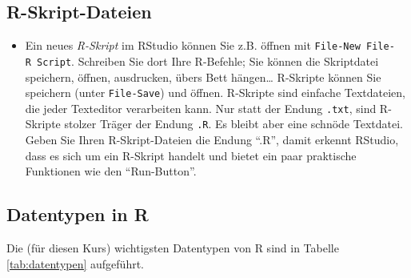 \documentclass[12pt,ngerman,]{book}
\providecommand{\tightlist}{%
  \setlength{\itemsep}{0pt}\setlength{\parskip}{0pt}}
\theoremstyle{definition}
\theoremstyle{definition}
\theoremstyle{remark}
\begin{document}
\subsection{R-Skript-Dateien}\label{r-skript-dateien}

\begin{itemize}
\tightlist
\item
  Ein neues \emph{R-Skript} im RStudio können Sie z.B.
  öffnen mit \texttt{File-New\ File-R\ Script}. Schreiben Sie dort Ihre
  R-Befehle; Sie können die Skriptdatei speichern, öffnen, ausdrucken,
  übers Bett hängen\ldots{} R-Skripte können Sie speichern (unter
  \texttt{File-Save}) und öffnen. R-Skripte sind einfache Textdateien,
  die jeder Texteditor verarbeiten kann. Nur statt der Endung
  \texttt{.txt}, sind R-Skripte stolzer Träger der Endung \texttt{.R}.
  Es bleibt aber eine schnöde Textdatei. Geben Sie Ihren
  R-Skript-Dateien die Endung ``.R'', damit erkennt RStudio, dass es
  sich um ein R-Skript handelt und bietet ein paar praktische Funktionen
  wie den ``Run-Button''.
\end{itemize}

\subsection{Datentypen in R}\label{datentypen-in-r}

Die (für diesen Kurs) wichtigsten Datentypen von R sind in Tabelle
\ref{tab:datentypen} aufgeführt.
\end{document}
